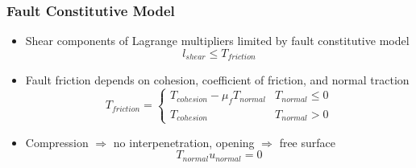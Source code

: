 \documentclass[aspectratio=169]{beamer}
\begin{document}
\begin{frame}
  \frametitle{Fault Constitutive Model}

  \begin{itemize}
  \item Shear components of Lagrange multipliers limited by fault
    constitutive model
    \begin{equation}
      l_\mathit{shear} \leq T_\mathit{friction}
    \end{equation}
  \item Fault friction depends on cohesion, coefficient of friction,
    and normal traction
    \begin{equation}
      T_\mathit{friction} = \left\{ \begin{array}{ll}
          T_\mathit{cohesion} - \mu_\mathit{f} T_\mathit{normal} &
          T_\mathit{normal} \leq 0 \\
          T_\mathit{cohesion} & T_\mathit{normal} > 0
        \end{array} \right.
    \end{equation}
  \item Compression $\Rightarrow$ no interpenetration, opening
    $\Rightarrow$ free surface
    \begin{equation}
      T_\mathit{normal} u_\mathit{normal} = 0 
    \end{equation}
  \end{itemize}
  
\end{frame}
\end{document}

